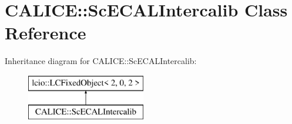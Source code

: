\section{C\-A\-L\-I\-C\-E\-:\-:Sc\-E\-C\-A\-L\-Intercalib Class Reference}
\label{classCALICE_1_1ScECALIntercalib}
Inheritance diagram for C\-A\-L\-I\-C\-E\-:\-:Sc\-E\-C\-A\-L\-Intercalib\-:\begin{figure}[H]
\begin{center}
\leavevmode
\includegraphics[height=2.000000cm]{classCALICE_1_1ScECALIntercalib}
\end{center}
\end{figure}
